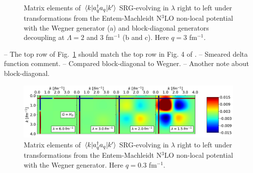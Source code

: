 \documentclass[preprintnumbers,floatfix,aps,prc,preprint,nofootinbib]{revtex4-1}
\begin{document}
\begin{figure}[H]
	\centering
	

	\caption{Matrix elements of $\mel{k}{a^{\dagger}_q a_q}{k'}$ SRG-evolving in $\lambda$ right to left under transformations from the Entem-Machleidt N$^3$LO non-local potential with the Wegner generator (a) and block-diagonal generators decoupling at $\Lambda=2$ and $3$ fm$^{-1}$ (b and c). Here $q=3$ fm$^{-1}$.}
	\label{momentum_projection_contours_q3,00_kvnn10}
\end{figure}

-- The top row of Fig.~\ref{momentum_projection_contours_q3,00_kvnn10} should match the top row in Fig. 4 of \cite{Anderson:2010aq}.
-- Smeared delta function comment.
-- Compared block-diagonal to Wegner.
-- Another note about block-diagonal.

\begin{figure}[H]
	\centering
	\includegraphics[clip,width=0.9\columnwidth]{momentum_projection_contours_q0,30_kvnn10_3S1_Wegner}
	\caption{Matrix elements of $\mel{k}{a^{\dagger}_q a_q}{k'}$ SRG-evolving in $\lambda$ right to left under transformations from the Entem-Machleidt N$^3$LO non-local potential with the Wegner generator. Here $q=0.3$ fm$^{-1}$.}
	\label{momentum_projection_contours_q0,30_kvnn10}
\end{figure}
\end{document}
